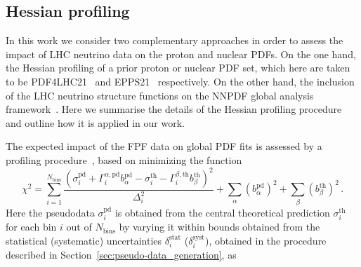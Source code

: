 \subsection{Hessian profiling}
\label{sec:profiling}

In this work we consider two complementary approaches in order to assess the
impact of LHC neutrino data on the proton and nuclear PDFs.
%
On the one hand, the Hessian profiling of a prior proton or
nuclear PDF set, which here are taken to be PDF4LHC21~\cite{PDF4LHCWorkingGroup:2022cjn} and
EPPS21~\cite{Eskola:2021nhw} respectively.
%
On the other hand, the inclusion of the LHC neutrino structure functions
on the NNPDF global analysis framework~\cite{NNPDF:2021uiq,NNPDF:2021njg}.
%
Here we summarise the details of the Hessian profiling procedure and
outline how it is applied in our work.


The expected impact of the FPF data on global PDF fits is assessed by a profiling procedure~\cite{Paukkunen:2014zia, Schmidt:2018hvu, AbdulKhalek:2018rok, HERAFitterdevelopersTeam:2015cre}, based on minimizing the function
\begin{equation}
\chi^2 = 
\sum_{i=1}^{N_{\textrm{bins}}} 
\frac{\left(  \sigma_i^{\textrm{pd}}
            + \Gamma_i^{\alpha,\textrm{pd}}
              b_\alpha^{\textrm{pd}}
            - \sigma_i^{\textrm{th}}
            - \Gamma_i^{\beta,\textrm{th}}
              b_\beta^{\textrm{th}}
     \right)^2
     }{\Delta_i^2}
+ \sum_\alpha (b_\alpha^{\textrm{pd}})^2
+ \sum_\beta  (b_\beta^{\textrm{th}})^2 \, .
\label{eq:profilingchi2}
\end{equation}
Here the pseudodata 
$\sigma_i^{\textrm{pd}}$ 
is obtained from the central theoretical prediction 
$\sigma_i^{\textrm{th}}$ 
for each bin $i$ out of $N_{\textrm{bins}}$ by varying it within bounds obtained from the statistical (systematic) uncertainties 
$\delta_i^{\textrm{stat}}$ ($\delta_i^{\textrm{syst}}$), 
obtained in the procedure described in Section~\ref{sec:pseudo-data_generation}, 
as 

